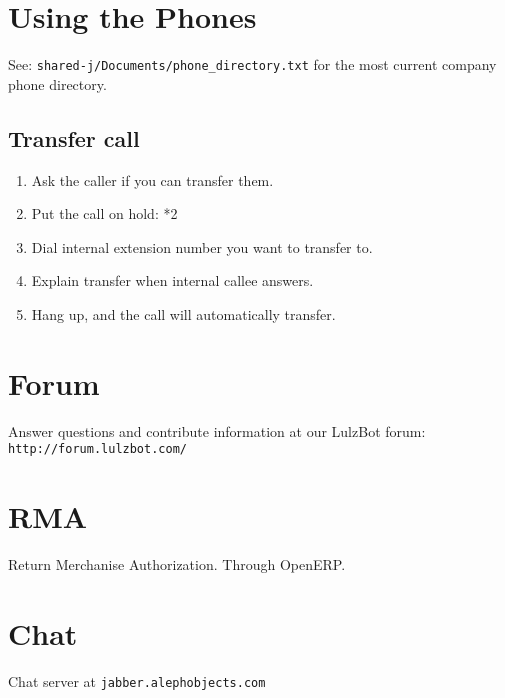 \section{Using the Phones}
See: \texttt{shared-j/Documents/phone\_directory.txt} for the most current
company phone directory.

\subsection{Transfer call}
\begin{enumerate}
\item Ask the caller if you can transfer them.
\item Put the call on hold: *2
\item Dial internal extension number you want to transfer to.
\item Explain transfer when internal callee answers.
\item Hang up, and the call will automatically transfer.
\end{enumerate}

\section{Forum}
Answer questions and contribute information at our LulzBot forum:
\texttt{http://forum.lulzbot.com/}

\section{RMA}
Return Merchanise Authorization. Through OpenERP.

\section{Chat}
Chat server at
\texttt{jabber.alephobjects.com}
